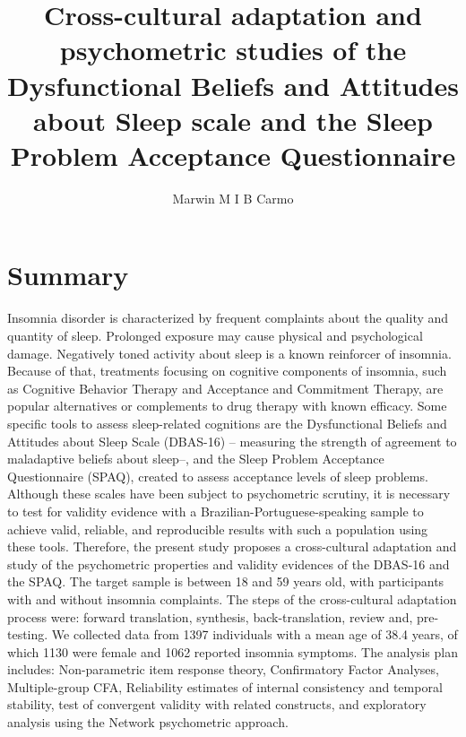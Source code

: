 \documentclass[
  ,doc,11pt, twoside,floatsintext]{apa6}
\title{Cross-cultural adaptation and psychometric studies of the Dysfunctional Beliefs and Attitudes about Sleep scale and the Sleep Problem Acceptance Questionnaire}
\author{Marwin M I B Carmo\textsuperscript{}}
\date{}
\affiliation{\vspace{0.5cm}\textsuperscript{} }
\begin{document}
\maketitle

\newpage
\setcounter{page}{1}

\thispagestyle{empty}

\newpage

\begin{flushleft}
{
\tableofcontents
}
\end{flushleft}

\newpage

\thispagestyle{empty}

\hypertarget{summary}{%
\section{Summary}\label{summary}}

Insomnia disorder is characterized by frequent complaints about the quality and quantity of sleep. Prolonged exposure may cause physical and psychological damage. Negatively toned activity about sleep is a known reinforcer of insomnia. Because of that, treatments focusing on cognitive components of insomnia, such as Cognitive Behavior Therapy and Acceptance and Commitment Therapy, are popular alternatives or complements to drug therapy with known efficacy. Some specific tools to assess sleep-related cognitions are the Dysfunctional Beliefs and Attitudes about Sleep Scale (DBAS-16) -- measuring the strength of agreement to maladaptive beliefs about sleep--, and the Sleep Problem Acceptance Questionnaire (SPAQ), created to assess acceptance levels of sleep problems. Although these scales have been subject to psychometric scrutiny, it is necessary to test for validity evidence with a Brazilian-Portuguese-speaking sample to achieve valid, reliable, and reproducible results with such a population using these tools. Therefore, the present study proposes a cross-cultural adaptation and study of the psychometric properties and validity evidences of the DBAS-16 and the SPAQ. The target sample is between 18 and 59 years old, with participants with and without insomnia complaints. The steps of the cross-cultural adaptation process were: forward translation, synthesis, back-translation, review and, pre-testing. We collected data from 1397 individuals with a mean age of 38.4 years, of which 1130 were female and 1062 reported insomnia symptoms. The analysis plan includes: Non-parametric item response theory, Confirmatory Factor Analyses, Multiple-group CFA, Reliability estimates of internal consistency and temporal stability, test of convergent validity with related constructs, and exploratory analysis using the Network psychometric approach.
\end{document}

